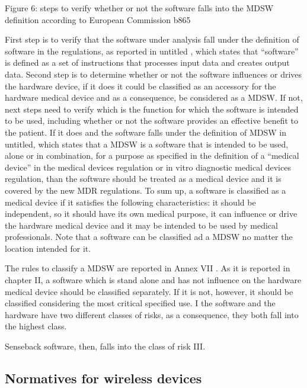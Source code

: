 \documentclass{Configuration_Files/PoliMi3i_thesis}
\begin{document}
Figure 6: steps to verify whether or not the software falls into the MDSW definition according to European Commission \cite{} b865

First step is to verify that the software under analysis fall under the definition of software in the regulations, as reported in \cite{} untitled , which states that “software” is defined as a set of instructions that processes input data and creates output data. Second step is to determine whether or not the software influences or drives the hardware device, if it does it could be classified as an accessory for the hardware medical device and as a consequence, be considered as a MDSW. If not, next steps need to verify which is the function for which the software is intended to be used, including whether or not the software provides an effective benefit to the patient. If it does and the software falls under the definition of MDSW in \cite{} untitled, which states that a MDSW is a software that is intended to be used, alone or in combination, for a purpose as specified in the definition of a “medical device” in the medical devices regulation or in vitro diagnostic medical devices regulation, than the software should be treated as a medical device and it is covered by the new MDR regulations.
To sum up, a software is classified as a medical device if it satisfies the following characteristics: it should be independent, so it should have its own medical purpose, it can influence or drive the hardware medical device and it may be intended to be used by medical professionals. Note that a software can be classified ad a MDSW no matter the location intended for it.

The rules to classify a MDSW are reported in Annex VII \cite{massimopANNEXVIII2019}. As it is reported in chapter II, a software which is stand alone and has not influence on the hardware medical device should be classified separately. If it is not, however, it should be classified considering the most critical specified use. I the software and the hardware have two different classes of risks, as a consequence, they both fall into the highest class.

Senseback software, then, falls into the class of risk III. 

\subsection{Normatives for wireless devices}
\end{document}
